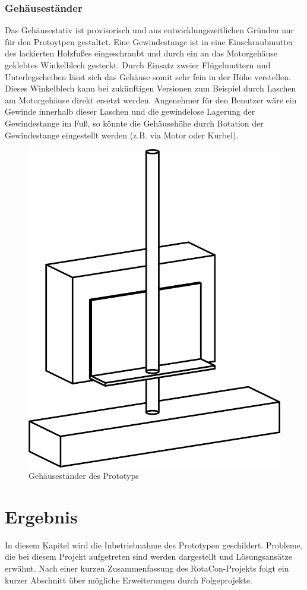 \documentclass[11pt, titlepage, fleqn]{report}
\begin{document}
			\subsection{Gehäuseständer}
				Das Gehäusestativ ist provisorisch und aus entwicklungszeitlichen Gründen nur für den Protoytpen gestaltet. Eine Gewindestange ist in eine Einschraubmutter des lackierten Holzfußes eingeschraubt und durch ein an das Motorgehäuse geklebtes Winkelblech gesteckt. Durch Einsatz zweier Flügelmuttern und Unterlegscheiben lässt sich das Gehäuse somit sehr fein in der Höhe verstellen. Dieses Winkelblech kann bei zukünftigen Versionen zum Beispiel durch Laschen am Motorgehäuse direkt ersetzt werden. Angenehmer für den Benutzer wäre ein Gewinde innerhalb dieser Laschen und die gewindelose Lagerung der Gewindestange im Fuß, so könnte die Gehäusehöhe durch Rotation der Gewindestange eingestellt werden (z.B. via Motor oder Kurbel).
				\vspace{3em}
				\begin{figure}[htbp]
					\centering
					\includegraphics[width=0.75\linewidth]{./img/RotaCon.png}
					\caption{Gehäuseständer des Prototyps
					\label{fig:imgRotaCon}}			
				\end{figure}
		\newpage
	\chapter{Ergebnis}
	\label{sec:Epilog}
		In diesem Kapitel wird die Inbetriebnahme des Prototypen geschildert. Probleme, die bei diesem Projekt aufgetreten sind werden dargestellt und Lösungsansätze erwähnt. Nach einer kurzen Zusammenfassung des RotaCon-Projekts folgt ein kurzer Abschnitt über mögliche Erweiterungen durch Folgeprojekte.
\end{document}
